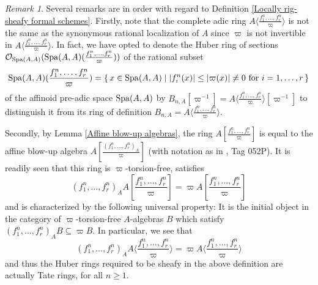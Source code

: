 \documentclass[12pt,twoside,a4paper]{article}
\theoremstyle{definition}
\theoremstyle{remark}
\newtheorem{rmk}[thm]{Remark}
\newcommand\Spa{{\rm Spa}}
\begin{document}
\begin{rmk}\label{Remark on rig-sheafiness}Several remarks are in order with regard to Definition \ref{Locally rig-sheafy formal schemes}. Firstly, note that the complete adic ring $A\langle\frac{f_{1}^{n},\dots,f_{r}^{n}}{\varpi}\rangle$ is not the same as the synonymous rational localization of $A$ since $\varpi$ is not invertible in $A\langle\frac{f_{1}^{n},\dots,f_{r}^{n}}{\varpi}\rangle$. In fact, we have opted to denote the Huber ring of sections $\mathcal{O}_{\Spa(A, A)}(\Spa(A, A)(\frac{f_1^{n},\dots, f_r^{n}}{\varpi}))$ of the rational subset \begin{equation*}\Spa(A, A)(\frac{f_1^{n},\dots,f_r^{n}}{\varpi})=\{\, x\in \Spa(A, A)\mid \vert f_{i}^{n}(x)\vert\leq \vert\varpi(x)\vert\neq 0 \ \text{for} i=1,\dots, r\,\}\end{equation*}of the affinoid pre-adic space $\Spa(A, A)$ by $B_{n,A}[\varpi^{-1}]=A\langle\frac{f_1^{n},\dots, f_r^{n}}{\varpi}\rangle[\varpi^{-1}]$ to distinguish it from its ring of definition $B_{n,A}=A\langle\frac{f_{1}^{n},\dots,f_{r}^{n}}{\varpi}\rangle$. 

Secondly, by Lemma \ref{Affine blow-up algebras}, the ring $A[\frac{f_1^{n},\dots, f_r^{n}}{\varpi}]$ is equal to the affine blow-up algebra $A[\frac{(f_1^{n},\dots,f_r^{n})_{A}}{\varpi}]$ (with notation as in \cite{Stacks}, Tag 052P). It is readily seen that this ring is $\varpi$-torsion-free, satisfies\begin{equation*}(f_1^{n},\dots, f_r^{n})_{A}A[\frac{f_1^{n},\dots, f_r^{n}}{\varpi}]=\varpi A[\frac{f_1^{n},\dots, f_r^{n}}{\varpi}]\end{equation*}and is characterized by the following universal property: It is the initial object in the category of $\varpi$-torsion-free $A$-algebras $B$ which satisfy $(f_{1}^{n},\dots, f_{r}^{n})_{A}B\subseteq\varpi B$. In particular, we see that \begin{equation*}(f_{1}^{n},\dots, f_{r}^{n})_{A}A\langle\frac{f_1^{n},\dots, f_r^{n}}{\varpi}\rangle=\varpi A\langle\frac{f_1^{n},\dots,f_r^{n}}{\varpi}\rangle\end{equation*}and thus the Huber rings required to be sheafy in the above definition are actually Tate rings, for all $n\geq1$. 


\end{rmk}
\end{document}
